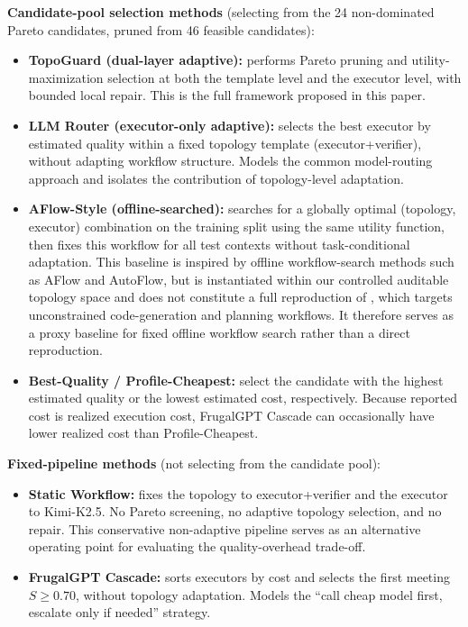 \documentclass[manuscript,review,anonymous]{acmart}
\begin{document}
\textbf{Candidate-pool selection methods} (selecting from the 24 non-dominated Pareto candidates, pruned from 46 feasible candidates):
\begin{itemize}
    \item \textbf{TopoGuard (dual-layer adaptive):} performs Pareto pruning and utility-maximization selection at both the template level and the executor level, with bounded local repair. This is the full framework proposed in this paper.
    \item \textbf{LLM Router (executor-only adaptive):} selects the best executor by estimated quality within a fixed topology template (executor+verifier), without adapting workflow structure. Models the common model-routing approach and isolates the contribution of topology-level adaptation.
    \item \textbf{AFlow-Style (offline-searched):} searches for a globally optimal (topology, executor) combination on the training split using the same utility function, then fixes this workflow for all test contexts without task-conditional adaptation. This baseline is inspired by offline workflow-search methods such as AFlow and AutoFlow, but is instantiated within our controlled auditable topology space and does not constitute a full reproduction of \cite{zhang2024aflow}, which targets unconstrained code-generation and planning workflows. It therefore serves as a proxy baseline for fixed offline workflow search rather than a direct reproduction.
    \item \textbf{Best-Quality / Profile-Cheapest:} select the candidate with the highest estimated quality or the lowest estimated cost, respectively. Because reported cost is realized execution cost, FrugalGPT Cascade can occasionally have lower realized cost than Profile-Cheapest.
\end{itemize}

\textbf{Fixed-pipeline methods} (not selecting from the candidate pool):
\begin{itemize}
    \item \textbf{Static Workflow:} fixes the topology to executor+verifier and the executor to Kimi-K2.5. No Pareto screening, no adaptive topology selection, and no repair. This conservative non-adaptive pipeline serves as an alternative operating point for evaluating the quality-overhead trade-off.
    \item \textbf{FrugalGPT Cascade:} sorts executors by cost and selects the first meeting $S \geq 0.70$, without topology adaptation. Models the ``call cheap model first, escalate only if needed'' strategy.
\end{itemize}
\end{document}

